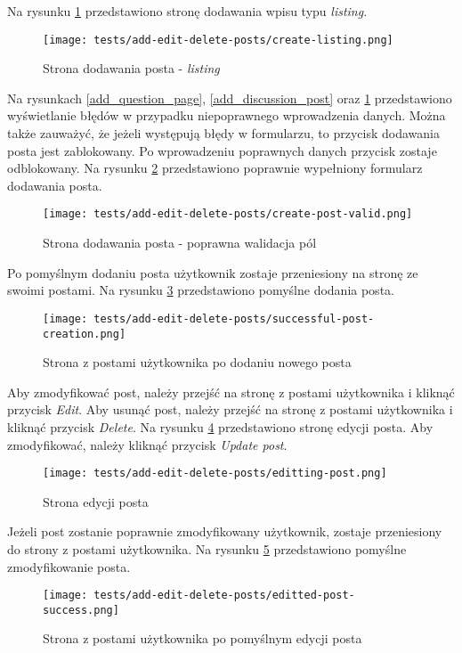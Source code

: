 Na rysunku \ref{add_listing_post} przedstawiono stronę dodawania wpisu typu \textit{listing}.
\begin{figure}[H]
  \centering
  \texttt{[image: tests/add-edit-delete-posts/create-listing.png]}
  \caption{Strona dodawania posta - \textit{listing}}
  \label{add_listing_post}
\end{figure}
Na rysunkach \ref{add_question_page}, \ref{add_discussion_post} oraz \ref{add_listing_post} przedstawiono wyświetlanie błędów w przypadku niepoprawnego wprowadzenia danych. Można także zauważyć, że jeżeli występują błędy w formularzu, to przycisk dodawania posta jest zablokowany. Po wprowadzeniu poprawnych danych przycisk zostaje odblokowany. Na rysunku \ref{add_valid_post} przedstawiono poprawnie wypełniony formularz dodawania posta.
\begin{figure}[H]
  \centering
  \texttt{[image: tests/add-edit-delete-posts/create-post-valid.png]}
  \caption{Strona dodawania posta - poprawna walidacja pól}
  \label{add_valid_post}
\end{figure}
Po pomyślnym dodaniu posta użytkownik zostaje przeniesiony na stronę ze swoimi postami. Na rysunku \ref{add_post_success} przedstawiono pomyślne dodania posta.
\begin{figure}[H]
  \centering
  \texttt{[image: tests/add-edit-delete-posts/successful-post-creation.png]}
  \caption{Strona z postami użytkownika po dodaniu nowego posta}
  \label{add_post_success}
\end{figure}
Aby zmodyfikować post, należy przejść na stronę z postami użytkownika i kliknąć przycisk \textit{Edit}. Aby usunąć post, należy przejść na stronę z postami użytkownika i kliknąć przycisk \textit{Delete}. Na rysunku \ref{edit_post} przedstawiono stronę edycji posta. Aby zmodyfikować, należy kliknąć przycisk \textit{Update post}. 
\begin{figure}[H]
  \centering
  \texttt{[image: tests/add-edit-delete-posts/editting-post.png]}
  \caption{Strona edycji posta}
  \label{edit_post}
\end{figure}
Jeżeli post zostanie poprawnie zmodyfikowany użytkownik, zostaje przeniesiony do strony z postami użytkownika. Na rysunku \ref{edit_post_success} przedstawiono pomyślne zmodyfikowanie posta.
\begin{figure}[H]
  \centering
  \texttt{[image: tests/add-edit-delete-posts/editted-post-success.png]}
  \caption{Strona z postami użytkownika po pomyślnym edycji posta}
  \label{edit_post_success}
\end{figure}

